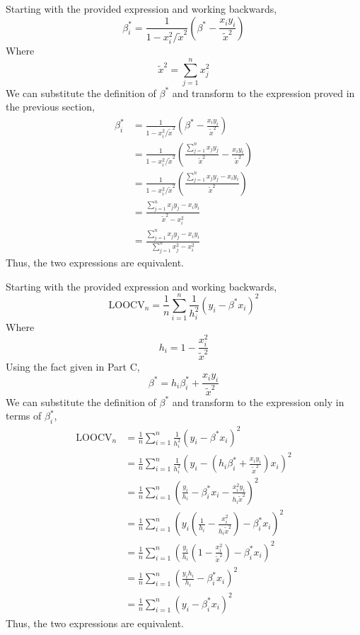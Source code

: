 \documentclass[12pt,twoside]{article}
\begin{document}
\begin{problems}
\begin{problemparts}
\problempart %

Starting with the provided expression and working backwards,
$$ \beta_i^* = \frac{1}{1 - x_i^2 / \tilde{x}^2} \left(\beta^* - \frac{x_i y_i}{
\tilde{x}^2}\right) $$
Where
$$ \tilde{x}^2 = \sum_{j = 1}^n x_j^2 $$
We can substitute the definition of $\beta^*$ and transform to the expression
proved in the previous section,
\begin{align*}
    \beta_i^* &= \frac{1}{1 - x_i^2 / \tilde{x}^2} \left(\beta^* - \frac{x_i y_i}{
    \tilde{x}^2}\right) \\
    &= \frac{1}{1 - x_i^2 / \tilde{x}^2} \left(\frac{\sum_{j = 1}^n x_j y_j}{
    \tilde{x}^2} - \frac{x_i y_i}{ \tilde{x}^2}\right) \\
    &= \frac{1}{1 - x_i^2 / \tilde{x}^2} \left(\frac{\sum_{j = 1}^n x_j y_j - x_i 
    y_i}{\tilde{x}^2}\right) \\
    &= \frac{\sum_{j = 1}^n x_j y_j - x_i y_i}{\tilde{x}^2 - x_i^2} \\
    &= \frac{\sum_{j = 1}^n x_j y_j - x_i y_i}{\sum_{j = 1}^n x_j^2 - x_i^2}
\end{align*}
Thus, the two expressions are equivalent.

\problempart %

Starting with the provided expression and working backwards,
$$ \mathrm{LOOCV}_n = \frac{1}{n} \sum_{i = 1}^n \frac{1}{h_i^2} \left(y_i - \beta^* 
x_i\right)^2 $$
Where
$$ h_i = 1 - \frac{x_i^2}{\tilde{x}^2} $$
Using the fact given in Part C,
$$ \beta^* = h_i \beta_i^* + \frac{x_i y_i}{\tilde{x}^2} $$
We can substitute the definition of $\beta^*$ and transform to the expression only
in terms of $\beta_i^*$,
\begin{align*}
    \mathrm{LOOCV}_n &= \frac{1}{n} \sum_{i = 1}^n \frac{1}{h_i^2} \left(y_i - \beta^* 
    x_i\right)^2 \\
    &= \frac{1}{n} \sum_{i = 1}^n \frac{1}{h_i^2} \left(y_i - \left(h_i \beta_i^* + 
    \frac{x_i y_i}{\tilde{x}^2}\right) x_i\right)^2 \\
    &= \frac{1}{n} \sum_{i = 1}^n \left(\frac{y_i}{h_i} - \beta_i^* x_i - 
    \frac{x_i^2 y_i}{h_i \tilde{x}^2}\right)^2 \\
    &= \frac{1}{n} \sum_{i = 1}^n \left(y_i \left(\frac{1}{h_i} - \frac{x_i^2}{h_i 
    \tilde{x}^2} \right) - \beta_i^* x_i \right)^2 \\
    &= \frac{1}{n} \sum_{i = 1}^n \left(\frac{y_i}{h_i} \left(1 - \frac{x_i^2}{
    \tilde{x}^2} \right) - \beta_i^* x_i \right)^2 \\
    &= \frac{1}{n} \sum_{i = 1}^n \left(\frac{y_i h_i}{h_i} - \beta_i^* x_i 
    \right)^2 \\
    &= \frac{1}{n} \sum_{i = 1}^n \left(y_i - \beta_i^* x_i \right)^2 
\end{align*}
Thus, the two expressions are equivalent.


\end{problemparts}
\end{problems}
\end{document}
